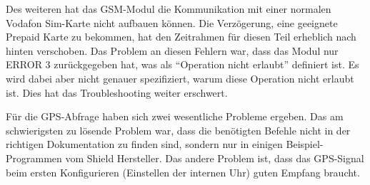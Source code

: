 Des weiteren hat das GSM-Modul die Kommunikation mit einer normalen Vodafon Sim-Karte nicht aufbauen können. Die Verzögerung, eine geeignete Prepaid Karte zu bekommen, hat den Zeitrahmen für diesen Teil erheblich nach hinten verschoben.
Das Problem an diesen Fehlern war, dass das Modul nur ERROR 3 zurückgegeben hat, was als “Operation nicht erlaubt” definiert ist. Es wird dabei aber nicht genauer spezifiziert, warum diese Operation nicht erlaubt ist. Dies hat das Troubleshooting weiter erschwert.

Für die GPS-Abfrage haben sich zwei wesentliche Probleme ergeben. Das am schwierigsten zu lösende Problem war, dass die benötigten Befehle nicht in der richtigen Dokumentation zu finden sind, sondern nur in einigen Beispiel-Programmen vom Shield Hersteller. Das andere Problem ist, dass das GPS-Signal beim ersten Konfigurieren (Einstellen der internen Uhr) guten Empfang braucht.

